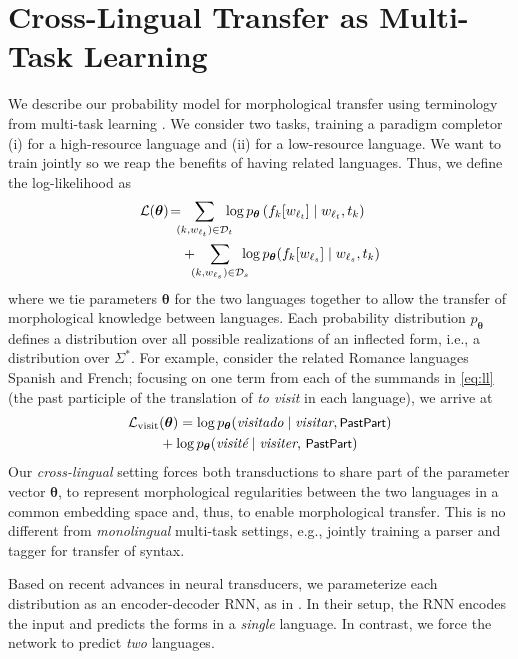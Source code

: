 \documentclass[11pt,letterpaper]{article}
\newcommand{\word}[1]{{\em #1}}
\newcommand{\mtag}[1]{{\small{\textsf{#1}}}}
\newcommand{\ptheta}{p_{{\boldsymbol \theta}}}
\begin{document}
\section{Cross-Lingual Transfer as Multi-Task Learning}
We describe our probability model for morphological transfer using terminology from
multi-task learning \cite{caruana1998multitask,collobert2011natural}. 
We consider two tasks,  training
a paradigm completor (i) for a high-resource language and (ii)
for a low-resource language. We want
to train jointly so we reap the benefits of having related languages.
Thus, we define the log-likelihood as
\begin{align}
  {\cal L}({\boldsymbol \theta})\!=& \!\!\!\sum_{(k, w_{\ell_t}) \in {\cal D}_t} \!\!\!\!\log \ptheta\left(f_{k}[w_{\ell_t}] \mid w_{\ell_t}, t_{k} \right) \label{eq:ll} \\ 
  & + \!\!\!\sum_{(k, w_{\ell_s}) \in {\cal D}_s}\!\!\!\! \log \ptheta (f_k[w_{\ell_s}] \mid w_{\ell_s}, t_{k}) \nonumber
\end{align}
 where we tie parameters ${\boldsymbol \theta}$ for the two languages together to allow the transfer
of morphological knowledge between languages.
Each probability distribution $\ptheta$ defines a
distribution over all possible realizations of an inflected form,
i.e., a distribution over $\Sigma^*$.  For example, consider the
related Romance languages Spanish and French; focusing on one term
from each of the summands in \cref{eq:ll} (the past participle of
the translation of \word{to visit} in each language), we arrive at
\begin{align}
  {\cal L}_{\text{visit}}&({\boldsymbol \theta}) = \log\ptheta(\text{\word{visitado}} \mid \text{\word{visitar}}, \text{\footnotesize \mtag{PastPart}}) \nonumber \\ 
  & + \log\ptheta(\text{\word{visit{\'e}}} \mid \text{\word{visiter}, \text{\footnotesize \mtag{PastPart}}})
\end{align}
Our \emph{cross-lingual} setting
forces both transductions to share part of the parameter vector ${\boldsymbol \theta}$,
to represent morphological regularities between the two languages in a common embedding space
and, thus, to enable morphological transfer. This is no
different from \emph{monolingual} multi-task settings, e.g.,
jointly training
a parser and  tagger for transfer of syntax.

Based on recent advances in neural
transducers, we parameterize each distribution as an encoder-decoder
RNN, as in \cite{kann2016med}. 
In their
setup, the RNN encodes the input and predicts the forms in a {\em
single} language. In contrast, we force the network to predict {\em two} languages.
\end{document}
